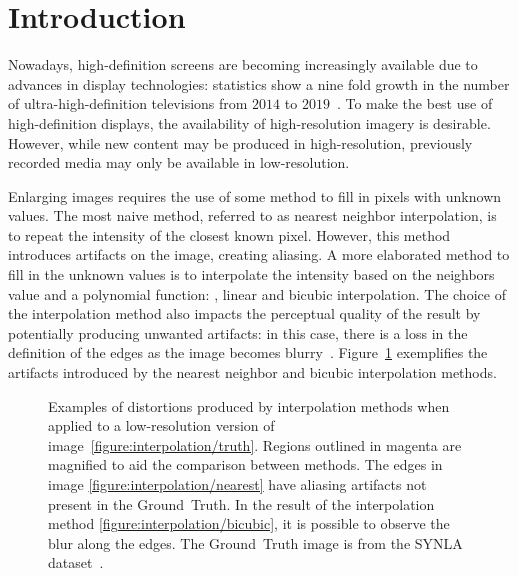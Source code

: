 \section{Introduction}

Nowadays, high-definition screens are becoming increasingly available due to advances in display technologies: statistics show a nine fold growth in the number of ultra-high-definition televisions from $2014$ to $2019$~\cite{statista2019tv}. To make the best use of high-definition displays, the availability of high-resolution imagery is desirable. However, while new content may be produced in high-resolution, previously recorded media may only be available in low-resolution.

Enlarging images requires the use of some method to fill in pixels with unknown values. The most naive method, referred to as nearest neighbor interpolation, is to repeat the intensity of the closest known pixel. However, this method introduces artifacts on the image, creating aliasing. A more elaborated method to fill in the unknown values is to interpolate the intensity based on the neighbors value and a polynomial function: \eg, linear and bicubic interpolation. The choice of the interpolation method also impacts the perceptual quality of the result by potentially producing unwanted artifacts: in this case, there is a loss in the definition of the edges as the image becomes blurry~\cite{gonzalez2018}. Figure~\ref{fig:interpolation} exemplifies the artifacts introduced by the nearest neighbor and bicubic interpolation methods.

\begin{figure}[t]
  \centering

  \hfill
  \hfill

  \caption{
    Examples of distortions produced by interpolation methods when applied to a low-resolution version of image~\ref{figure:interpolation/truth}. Regions outlined in magenta are magnified to aid the comparison between methods. The edges in image \ref{figure:interpolation/nearest} have aliasing artifacts not present in the Ground~Truth. In the result of the interpolation method \ref{figure:interpolation/bicubic}, it is possible to observe the blur along the edges. The Ground~Truth image is from the SYNLA dataset~\cite{synla}.
    \label{fig:interpolation}}
\end{figure}

